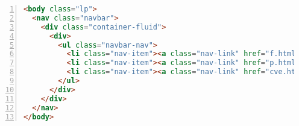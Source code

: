 \documentclass[a4paper,12pt]{article}
\begin{document}
\newpage
\begin{lstlisting}[language=HTML, caption={Documento en HTML}, label={lst:1}, numbers=left]
<body class="lp">
  <nav class="navbar">
    <div class="container-fluid">
      <div>
        <ul class="navbar-nav">
          <li class="nav-item"><a class="nav-link" href="f.html">Info</a></li>
          <li class="nav-item"><a class="nav-link" href="p.html">Precios</a></li>
          <li class="nav-item"><a class="nav-link" href="cve.html">CVE</a></li>
        </ul>
      </div>
    </div>
  </nav>
</body>
\end{lstlisting}
\end{document}
